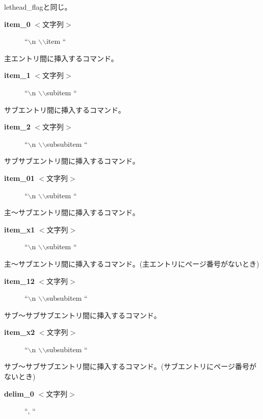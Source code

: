 \documentclass[10pt,dvipdfmx]{jsarticle}
\begin{document}
 lethead\_flagと同じ。\begin{description}
\item[\textbf{item\_0}
 $<$文字列$>$] ``$\backslash$n $\backslash$$\backslash$item ``

\end{description}
 主エントリ間に挿入するコマンド。\begin{description}
\item[\textbf{item\_1}
 $<$文字列$>$] ``$\backslash$n $\backslash$$\backslash$subitem ``

\end{description}
 サブエントリ間に挿入するコマンド。\begin{description}
\item[\textbf{item\_2}
 $<$文字列$>$] ``$\backslash$n $\backslash$$\backslash$subsubitem ``

\end{description}
 サブサブエントリ間に挿入するコマンド。\begin{description}
\item[\textbf{item\_01}
 $<$文字列$>$] ``$\backslash$n $\backslash$$\backslash$subitem ``

\end{description}
 主〜サブエントリ間に挿入するコマンド。\begin{description}
\item[\textbf{item\_x1}
 $<$文字列$>$] ``$\backslash$n $\backslash$$\backslash$subitem ``

\end{description}
 主〜サブエントリ間に挿入するコマンド。(主エントリにページ番号がないとき)\begin{description}
\item[\textbf{item\_12}
 $<$文字列$>$] ``$\backslash$n $\backslash$$\backslash$subsubitem ``

\end{description}
 サブ〜サブサブエントリ間に挿入するコマンド。\begin{description}
\item[\textbf{item\_x2}
 $<$文字列$>$] ``$\backslash$n $\backslash$$\backslash$subsubitem ``

\end{description}
 サブ〜サブサブエントリ間に挿入するコマンド。(サブエントリにページ番号がないとき)\begin{description}
\item[\textbf{delim\_0}
 $<$文字列$>$] ``, ``

\end{description}
\end{document}
